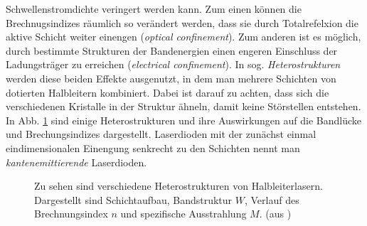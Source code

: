 Schwellenstromdichte veringert werden kann. Zum einen können die
Brechnugsindizes räumlich so verändert werden, dass sie durch Totalrefelxion die
aktive Schicht weiter einengen (\textit{optical confinement}). Zum anderen ist
es möglich, durch bestimmte Strukturen der Bandenergien einen engeren Einschluss
der Ladungsträger zu erreichen (\textit{electrical confinement}). In sog.
\textit{Heterostrukturen} werden diese beiden Effekte ausgenutzt, in dem man
mehrere Schichten von dotierten Halbleitern kombiniert. Dabei ist darauf zu
achten, dass sich die verschiedenen Kristalle in der Struktur ähneln, damit
keine Störstellen entstehen. In Abb. \ref {fig:heterostrukturen} sind einige
Heterostrukturen und ihre Auswirkungen auf die Bandlücke und Brechungsindizes
dargestellt. Laserdioden mit der zunächst einmal eindimensionalen Einengung
senkrecht zu den Schichten nennt man \textit{kantenemittierende} Laserdioden.
\begin{figure}[h]
	\centering
	\caption[Heterostrukturen]{Zu sehen sind verschiedene Heterostrukturen von
	Halbleiterlasern. Dargestellt sind Schichtaufbau,
	Bandstruktur $W$, Verlauf des Brechnungsindex $n$ 
	und spezifische Ausstrahlung $M$. (aus
	\cite{schumann:2001:diplomarbeit})}\label{fig:heterostrukturen}
\end{figure}

